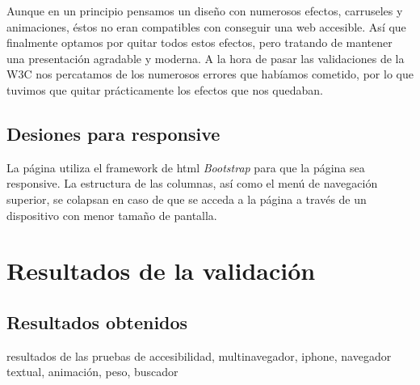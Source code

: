 Aunque en un principio pensamos un diseño con numerosos efectos, carruseles y animaciones, éstos no eran compatibles con conseguir una web accesible. Así que finalmente optamos por quitar todos estos efectos, pero tratando de mantener una presentación agradable y moderna.
A la hora de pasar las validaciones de la W3C nos percatamos de los numerosos errores que habíamos cometido, por lo que tuvimos que quitar prácticamente los efectos que nos quedaban.

\subsection{Desiones para responsive}
La página utiliza el framework de html \textit{Bootstrap} para que la página sea responsive. La estructura de las columnas, así como el menú de navegación superior, se colapsan en caso de que se acceda a la página a través de un dispositivo con menor tamaño de pantalla.
\section{Resultados de la validación}
\subsection{Resultados obtenidos}
resultados de las pruebas de accesibilidad, multinavegador, iphone, navegador textual, animación, peso, buscador




